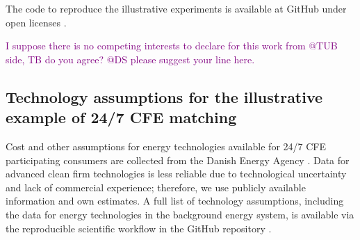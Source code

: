 \documentclass[pdflatex,sn-basic, Numbered]{sn-jnl}%
\theoremstyle{thmstyleone}%
\theoremstyle{thmstyletwo}%
\theoremstyle{thmstylethree}%
\newcommand{\comment}[1]{\textcolor{purple}{#1}}
\begin{document}
 The code to reproduce the illustrative experiments is available at GitHub under open licenses \cite{code247CFE}.

 \comment{I suppose there is no competing interests to declare for this work from @TUB side, TB do you agree? @DS please suggest your line here.}




\FloatBarrier
\newpage 

\subsection*{Technology assumptions for the illustrative example of 24/7 CFE matching}
\label{sec:annex}

Cost and other assumptions for energy technologies available for 24/7 CFE participating consumers are collected from the Danish Energy Agency \cite{DEA-technologydata}.
Data for advanced clean firm technologies is less reliable due to technological uncertainty and lack of commercial experience; therefore, we use publicly available information and own estimates.
A full list of technology assumptions, including the data for energy technologies in the background energy system, is available via the reproducible scientific workflow in the GitHub repository \cite{code247CFE}.
\end{document}

